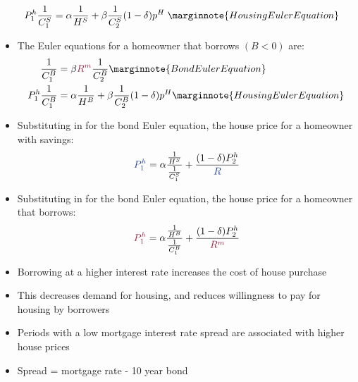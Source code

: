 \documentclass{article}
\numberwithin{equation}{section}
\numberwithin{figure}{section}
\begin{document}
\begin{itemize}
\begin{align*}
			P_1^h\frac{1}{C_1^S} &= \alpha\frac{1}{H^S}+\beta\frac{1}{C_2^S}(1-\delta)p^H \;\marginnote{Housing Euler Equation}
		\end{align*}
		\item The Euler equations for a homeowner that \textcolor{myred}{borrows} \( (B<0) \) are:
		\begin{align*}
			\frac{1}{C_1^B} &= \beta\textcolor{myred}{R^m}\frac{1}{C_2^B}\marginnote{Bond Euler Equation}\\
			P_1^h\frac{1}{C_1^B} &= \alpha\frac{1}{H^B}+\beta\frac{1}{C_2^B}(1-\delta)p^H\marginnote{Housing Euler Equation}
		\end{align*}
		\item Substituting in for the bond Euler equation, the house price for a homeowner with \textcolor{myblue}{savings}:
		\[
			\textcolor{myblue}{P_1^h} = \alpha\frac{\frac{1}{H^S}}{\frac{1}{C_1^S}}+\frac{(1-\delta)P_2^h}{\textcolor{myblue}{R}}
		\]
		\item Substituting in for the bond Euler equation, the house price for a homeowner that \textcolor{myred}{borrows}:
		\[
			\textcolor{myred}{P_1^h} = \alpha\frac{\frac{1}{H^B}}{\frac{1}{C^B_1}} + \frac{(1-\delta)P_2^h}{\textcolor{myred}{R^m}}
		\]
		\item Borrowing at a higher interest rate increases the cost of house purchase
		\item This decreases demand for housing, and reduces willingness to pay for housing by borrowers
		\item Periods with a low mortgage interest rate \textcolor{myblue}{spread} are associated with higher house prices
		\item \textcolor{myblue}{Spread} = mortgage rate - 10 year bond
	\end{itemize}
\end{document}
